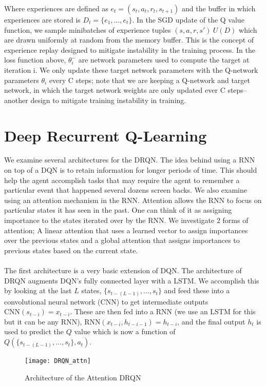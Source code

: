 \documentclass{article}
\begin{document}
Where experiences are defined as $e_t = (s_t, a_t, r_t, s_{t+1})$ and the buffer
in which experiences are stored is $D_t = \{e_1, \dots, e_t\}$. In the SGD update
of the Q value function, we sample minibatches of experience tuples
$(s, a, r, s') ~ U(D)$ which are drawn uniformly at random from the memory buffer.
This is the concept of experience replay designed to mitigate instability in the
training process. In the loss function above, $\theta_i^-$ are network parameters
used to compute the target at iteration i.  We only update these target network
parameters with the Q-network parameters $\theta_i$ every C steps; note that we are
keeping a Q-network and target network, in which the target network weights are
only updated ever C steps--another design to mitigate training instability in
training.

\section{Deep Recurrent Q-Learning}

We examine several architectures for the DRQN. The idea behind using a RNN on top
of a DQN is to retain information for longer periods of time. This should help the
agent accomplish tasks that may require the agent to remember a particular event
that happened several dozens screen backs. We also examine using an attention
mechanism in the RNN. Attention allows the RNN to focus on particular states it
has seen in the past. One can think of it as assigning importance to the states
iterated over by the RNN. We investigate $2$ forms of attention; A linear attention
that uses a learned vector to assign importances over the previous states and a
global attention that assigns importances to previous states based on the current
state. \\
\\
The first architecture is a very basic extension of DQN. The architecture of DRQN
augments DQN's fully connected layer with a LSTM. We accomplish this by looking at
the last $L$ states, $\{s_{t-(L-1)}, \dots, s_{t}\}$ and feed these into a
convolutional neural network (CNN) to get intermediate outputs
$\text{CNN}(s_{t-i}) = x_{t-i}$. These are then fed into a RNN (we use an LSTM for
this but it can be any RNN), $\text{RNN}(x_{t-i}, h_{t-i-1}) = h_{t-i}$, and the
final output $h_t$ is used to predict the $Q$ value which is now a function of
$Q(\{s_{t-(L-1)}, \dots, s_t\}, a_t)$.

\begin{figure}[h]
    \centering
    \texttt{[image: DRQN\_attn]}
    \caption{Architecture of the Attention DRQN}
\end{figure}
\end{document}
